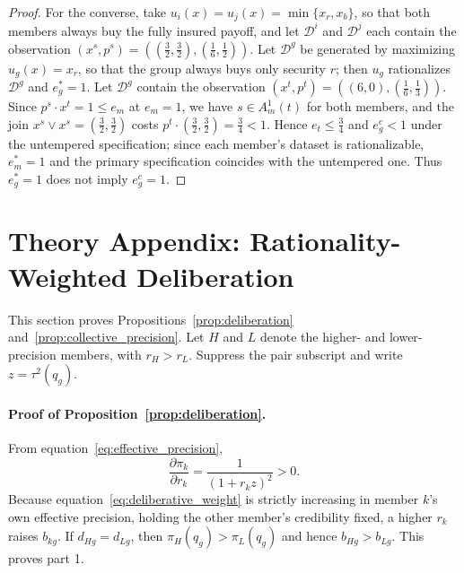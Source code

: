 \documentclass[11 pt]{article}
\begin{document}
\begin{proof}
For the converse, take $u_{i}(x) = u_{j}(x) = \min\{x_{r}, x_{b}\}$, so that both members always buy the fully insured payoff, and let $\mathcal{D}^{i}$ and $\mathcal{D}^{j}$ each contain the observation $(x^{s}, p^{s}) = ((\tfrac{3}{2}, \tfrac{3}{2}), (\tfrac{1}{6}, \tfrac{1}{2}))$. Let $\mathcal{D}^{g}$ be generated by maximizing $u_{g}(x) = x_{r}$, so that the group always buys only security $r$; then $u_{g}$ rationalizes $\mathcal{D}^{g}$ and $e^{*}_{g} = 1$. Let $\mathcal{D}^{g}$ contain the observation $(x^{t}, p^{t}) = ((6, 0), (\tfrac{1}{6}, \tfrac{1}{3}))$. Since $p^{s} \cdot x^{t} = 1 \leq e_{m}$ at $e_{m} = 1$, we have $s \in A^{1}_{m}(t)$ for both members, and the join $x^{s} \vee x^{s} = (\tfrac{3}{2}, \tfrac{3}{2})$ costs $p^{t} \cdot (\tfrac{3}{2}, \tfrac{3}{2}) = \tfrac{3}{4} < 1$. Hence $e_{t} \leq \tfrac{3}{4}$ and $e^{c}_{g} < 1$ under the untempered specification; since each member's dataset is rationalizable, $e^{*}_{m} = 1$ and the primary specification coincides with the untempered one. Thus $e^{*}_{g} = 1$ does not imply $e^{c}_{g} = 1$.
\end{proof}





\newpage

\section{Theory Appendix: Rationality-Weighted Deliberation}
\label{app:framework}

This section proves Propositions~\ref{prop:deliberation} and~\ref{prop:collective_precision}. Let $H$ and $L$ denote the higher- and lower-precision members, with $r_H>r_L$. Suppress the pair subscript and write $z=\tau^2(q_g)$.

\paragraph{Proof of Proposition~\ref{prop:deliberation}.}
From equation~\eqref{eq:effective_precision},
\begin{equation}
    \frac{\partial \pi_k}{\partial r_k}=\frac{1}{(1+r_k z)^2}>0.
    \label{eq:pi_derivative}
\end{equation}
Because equation~\eqref{eq:deliberative_weight} is strictly increasing in member $k$'s own effective precision, holding the other member's credibility fixed, a higher $r_k$ raises $b_{kg}$. If $d_{Hg}=d_{Lg}$, then $\pi_H(q_g)>\pi_L(q_g)$ and hence $b_{Hg}>b_{Lg}$. This proves part 1.
\end{document}

